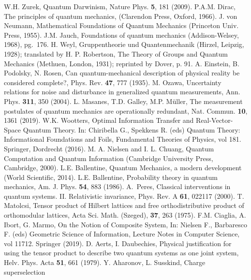 \documentclass[aps,prl,amsmath,amssymb,twocolumn]{revtex4}
\theoremstyle{plain}
\theoremstyle{definition}
\theoremstyle{remark}
\begin{document}
\begin{references}
 W.H. Zurek, Quantum Darwinism, Nature Phys. {\bf 5},
  181 (2009).
P.A.M. Dirac, The principles of quantum mechanics,
  (Clarendon Press, Oxford, 1966).
J. von Neumann, Mathematical Foundations of
  Quantum Mechanics (Princeton Univ.  Press, 1955).
J.M. Jauch, Foundations of quantum mechanics
  (Addison-Welsey, 1968), pg.~176.
 H. Weyl, Gruppentheorie und Quantenmechanik (Hirzel,
  Leipzig, 1928); translated by H. P. Robertson, The Theory of Groups
  and Quantum Mechanics (Methuen, London, 1931); reprinted by Dover,
  p. 91.
A. Einstein, B. Podolsky, N. Rosen, Can
  quantum-mechanical description of physical reality be considered
  complete?, Phys. Rev. {\bf 47}, 777 (1935).
M. Ozawa, {Uncertainty relations for noise and
    disturbance in generalized quantum measurements}, Ann. Phys.  {\bf
    311}, 350 (2004).
L. Masanes, T.D. Galley, M.P. M\" uller, The
  measurement postulates of quantum mechanics are operationally
  redundant, Nat. Commun. {\bf 10}, 1361 (2019).
W.K. Wootters, Optimal Information Transfer and
  Real-Vector-Space Quantum Theory. In: Chiribella G., Spekkens R.
  (eds) Quantum Theory: Informational Foundations and Foils,
  Fundamental Theories of Physics, vol 181. Springer, Dordrecht
  (2016).
M. A. Nielsen and I. L. Chuang, Quantum
  Computation and Quantum Information (Cambridge University Press,
  Cambridge, 2000).
L.E. Ballentine, Quantum Mechanics, a modern
  development (World Scientific, 2014).
L.E. Ballentine, Probability theory in
  quantum mechanics, Am. J. Phys. {\bf 54}, 883 (1986).
A.~Peres, Classical interventions in quantum systems.
  II. Relativistic invariance, Phys. Rev. A {\bf 61}, 022117 (2000).
 T. Matolcsi, Tensor product of Hilbert lattices and
  free orthodistributive product of orthomodular lattices, Acta Sci.
  Math. (Szeged), {\bf 37}, 263 (1975).
 F.M. Ciaglia, A. Ibort, G. Marmo, On the Notion of
  Composite System, In: Nielsen F., Barbaresco F. (eds) Geometric
  Science of Information, Lecture Notes in Computer Science, vol
  11712. Springer (2019).
 D. Aerts, I. Daubechies, Physical justification for
  using the tensor product to describe two quantum systems as one
  joint system, Helv. Phys. Acta {\bf 51}, 661 (1979).
Y. Aharonov, L. Susskind, Charge superselection

\end{references}
\end{document}
